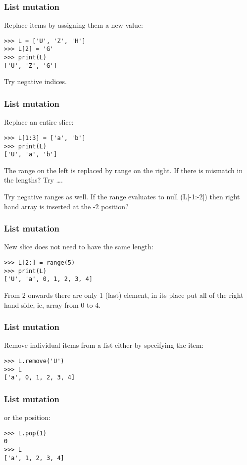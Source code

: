 \begin{frame}[fragile]\frametitle{List mutation}
Replace items by assigning them
  a new value:
\begin{lstlisting}
>>> L = ['U', 'Z', 'H']
>>> L[2] = 'G'
>>> print(L)
['U', 'Z', 'G']
\end{lstlisting}
Try negative indices.
\end{frame}

\begin{frame}[fragile]\frametitle{List mutation}

Replace an entire slice:
\begin{lstlisting}
>>> L[1:3] = ['a', 'b']
>>> print(L)
['U', 'a', 'b']
\end{lstlisting}
The range on the left is replaced by range on the right. If there is mismatch in the lengths? Try \ldots. 

Try negative ranges as well. If the range evaluates to null (L[-1:-2]) then right hand array is inserted at the -2 position?
\end{frame}


\begin{frame}[fragile]\frametitle{List mutation}
New slice does not need to have the same length:
\begin{lstlisting}
>>> L[2:] = range(5)
>>> print(L)
['U', 'a', 0, 1, 2, 3, 4]
\end{lstlisting}
From 2 onwards there are only 1 (last) element, in its place put all of the right hand side, ie, array from 0 to 4.
\end{frame}

\begin{frame}[fragile]\frametitle{List mutation}
Remove individual items from a list either by specifying the item:
\begin{lstlisting}
>>> L.remove('U')
>>> L
['a', 0, 1, 2, 3, 4]
\end{lstlisting}
\end{frame}

\begin{frame}[fragile]\frametitle{List mutation}
or the position:

\begin{lstlisting}
>>> L.pop(1)
0
>>> L
['a', 1, 2, 3, 4]
\end{lstlisting}
\end{frame}

